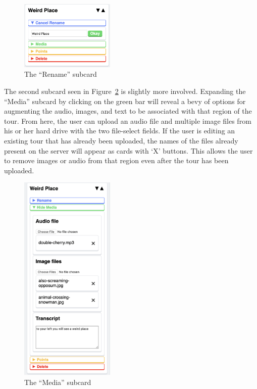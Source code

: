 \documentclass[a4paper, 10pt, american, titlepage]{article}
\begin{document}
\begin{figure}[h]
	\centering
	\includegraphics[width=0.4\textwidth]{rename-subcard-editour.png}
	\caption{The ``Rename'' subcard}
	\label{fig:renameSubcard}
\end{figure}

The second subcard seen in Figure~\ref{fig:mediaSubcard} is slightly more
involved. Expanding the ``Media'' subcard by clicking on the green bar will
reveal a bevy of options for augmenting the audio, images, and text to be
associated with that region of the tour. From here, the user can upload an
audio file and multiple image files from his or her hard drive with the two
file-select fields. If the user is editing an existing tour that has already
been uploaded, the names of the files already present on the server will appear
as cards with `X' buttons. This allows the user to remove images or audio from
that region even after the tour has been uploaded.

\begin{figure}[h]
	\centering
	\includegraphics[width=0.4\textwidth]{media-subcard-editour.png}
	\caption{The ``Media'' subcard}
	\label{fig:mediaSubcard}
\end{figure}
\end{document}
